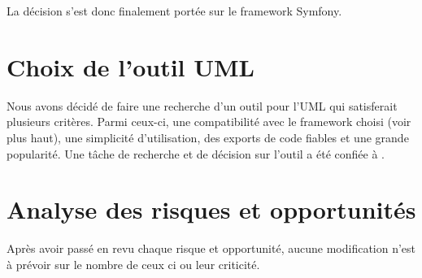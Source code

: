 \documentclass [a4paper] {article}
\begin{document}
La décision s'est donc finalement portée sur le framework Symfony.

\section{Choix de l'outil UML}
Nous avons décidé de faire une recherche d'un outil pour l'UML qui satisferait plusieurs critères. Parmi ceux-ci, une compatibilité avec le framework choisi (voir plus haut), une simplicité d'utilisation, des exports de code fiables et une grande popularité. Une tâche de recherche et de décision sur l'outil a été confiée à \Julie.

\section{Analyse des risques et opportunités}
Après avoir passé en revu chaque risque et opportunité, aucune modification n'est à prévoir sur le nombre de ceux ci ou leur criticité.


\end{document}
